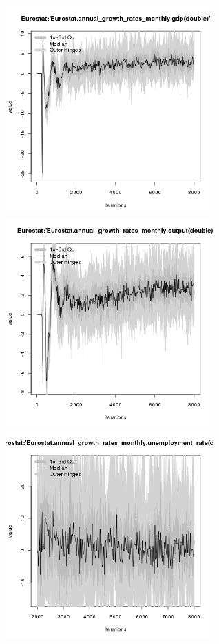 \begin{figure}[H!]
\centering\leavevmode
\begin{minipage}{17cm}
\centering\leavevmode
\includegraphics[width=8cm]{./benchmark_plots/Eurostat-annual_growth_rates_monthly-gdp.png}
\includegraphics[width=8cm]{./benchmark_plots/Eurostat-annual_growth_rates_monthly-output.png}\\
\includegraphics[width=8cm]{./benchmark_plots/Eurostat-annual_growth_rates_monthly-unemployment_rate.png}

\end{minipage}
\end{figure}
